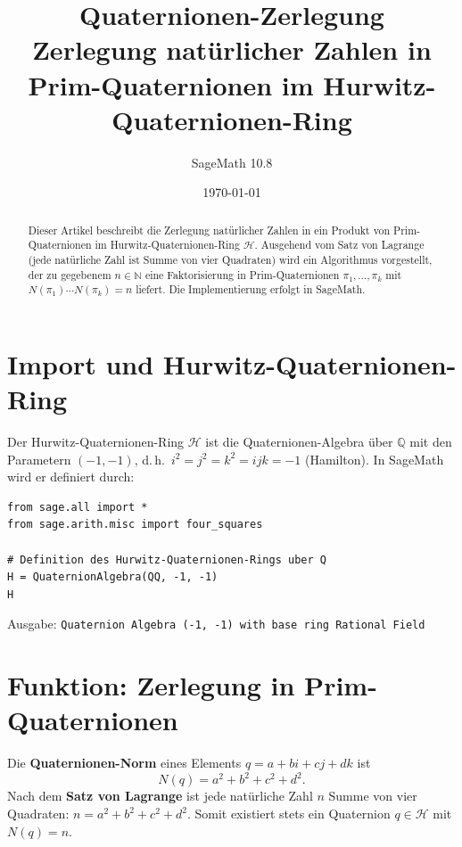 \documentclass[11pt, a4paper]{article}
\title{\textbf{Quaternionen-Zerlegung}\\[0.5em]
\large Zerlegung natürlicher Zahlen in Prim-Quaternionen im Hurwitz-Quaternionen-Ring}
\author{SageMath 10.8}
\date{\today}
\begin{document}
\maketitle

\begin{abstract}
\noindent
Dieser Artikel beschreibt die Zerlegung natürlicher Zahlen in ein Produkt von Prim-Quaternionen im Hurwitz-Quaternionen-Ring $\mathcal{H}$. Ausgehend vom Satz von Lagrange (jede natürliche Zahl ist Summe von vier Quadraten) wird ein Algorithmus vorgestellt, der zu gegebenem $n \in \mathbb{N}$ eine Faktorisierung in Prim-Quaternionen $\pi_1, \ldots, \pi_k$ mit $N(\pi_1) \cdots N(\pi_k) = n$ liefert. Die Implementierung erfolgt in SageMath.
\end{abstract}

\section{Import und Hurwitz-Quaternionen-Ring}

Der Hurwitz-Quaternionen-Ring $\mathcal{H}$ ist die Quaternionen-Algebra über $\mathbb{Q}$ mit den Parametern $(-1,-1)$, d.\,h.\, $i^2 = j^2 = k^2 = ijk = -1$ (Hamilton). In SageMath wird er definiert durch:

\begin{lstlisting}
from sage.all import *
from sage.arith.misc import four_squares

# Definition des Hurwitz-Quaternionen-Rings uber Q
H = QuaternionAlgebra(QQ, -1, -1)
H
\end{lstlisting}

Ausgabe: \texttt{Quaternion Algebra (-1, -1) with base ring Rational Field}

\section{Funktion: Zerlegung in Prim-Quaternionen}

Die \textbf{Quaternionen-Norm} eines Elements $q = a + bi + cj + dk$ ist
\[
N(q) = a^2 + b^2 + c^2 + d^2.
\]
Nach dem \textbf{Satz von Lagrange} ist jede natürliche Zahl $n$ Summe von vier Quadraten: $n = a^2 + b^2 + c^2 + d^2$. Somit existiert stets ein Quaternion $q \in \mathcal{H}$ mit $N(q) = n$.
\end{document}
